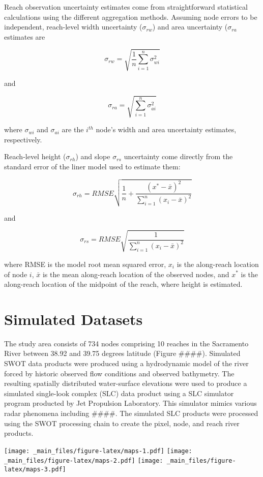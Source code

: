 \documentclass[]{book}
\begin{document}
Reach observation uncertainty estimates come from straightforward statistical calculations using the different aggregation methods. Assuming node errors to be independent, reach-level width uncertainty (\(\sigma_{rw}\)) and area uncertainty (\(\sigma_{ra}\) estimates are

\[
\sigma_{rw} = \sqrt{\frac{1}{n}\sum_{i=1}^n \sigma_{wi}^2}
\]

and

\[
\sigma_{ra} = \sqrt{\sum_{i=1}^n \sigma_{ai}^2}
\]

where \(\sigma_{wi}\) and \(\sigma_{ai}\) are the \(i^{th}\) node's width and area uncertainty estimates, respectively.

Reach-level height (\(\sigma_{rh}\)) and slope \(\sigma_{rs}\) uncertainty come directly from the standard error of the liner model used to estimate them:

\[
\sigma_{rh} = RMSE\sqrt{\frac{1}{n} + \frac{(x^* - \bar{x})^2}{\sum_{i = 1}^n (x_i - \bar{x})^2}}
\]

and

\[
\sigma_{rs} = RMSE \sqrt{\frac{1}{\sum_{i = 1}^n (x_i - \bar{x})^2}}
\]

where RMSE is the model root mean squared error, \(x_i\) is the along-reach location of node \(i\), \(\bar{x}\) is the mean along-reach location of the observed nodes, and \(x^*\) is the along-reach location of the midpoint of the reach, where height is estimated.

\hypertarget{simulated-datasets}{%
\section{Simulated Datasets}\label{simulated-datasets}}

The study area consists of 734 nodes comprising 10 reaches in the Sacramento River between 38.92 and 39.75 degrees latitude (Figure \#\#\#\#). Simulated SWOT data products were produced using a hydrodynamic model of the river forced by historic observed flow conditions and observed bathymetry. The resulting spatially distributed water-surface elevations were used to produce a simulated single-look complex (SLC) data product using a SLC simulator program producted by Jet Propulsion Laboratory. This simulator mimics various radar phenomena including \#\#\#\#. The simulated SLC products were processed using the SWOT processing chain to create the pixel, node, and reach river products.

\texttt{[image: \_main\_files/figure-latex/maps-1.pdf]} \texttt{[image: \_main\_files/figure-latex/maps-2.pdf]} \texttt{[image: \_main\_files/figure-latex/maps-3.pdf]}
\end{document}
